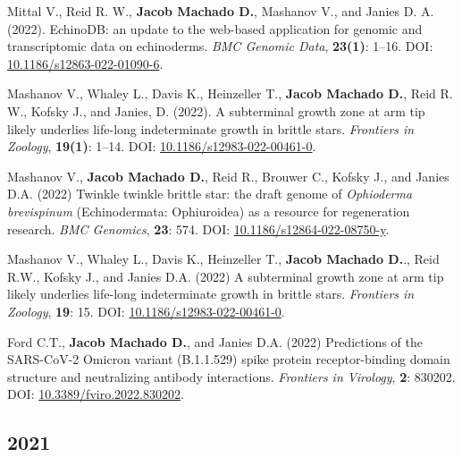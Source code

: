 \documentclass[11pt, letterpaper, sans]{moderncv}
\begin{document}
	{\setlength{\parskip}{.5em}\renewcommand{\baselinestretch}{2.0}\begin{hangparas}{.25in}{1}

		Mittal V., Reid R. W., \textbf{Jacob Machado D.}, Mashanov V., and Janies D. A. (2022). EchinoDB: an update to the web-based application for genomic and transcriptomic data on echinoderms. \textit{BMC Genomic Data}, \textbf{23(1)}: 1--16. DOI: \href{https://doi.org/10.1186/s12863-022-01090-6}{10.1186/s12863-022-01090-6}.

		Mashanov V., Whaley L., Davis K., Heinzeller T., \textbf{Jacob Machado D.}, Reid R. W., Kofsky J., and Janies, D. (2022). A subterminal growth zone at arm tip likely underlies life-long indeterminate growth in brittle stars. \textit{Frontiers in Zoology}, \textbf{19(1)}: 1--14. DOI: \href{https://doi.org/10.1186/s12983-022-00461-0}{10.1186/s12983-022-00461-0}.

		Mashanov V., \textbf{Jacob Machado D.}, Reid R., Brouwer C., Kofsky J., and Janies D.A. (2022) Twinkle twinkle brittle star: the draft genome of \textit{Ophioderma brevispinum} (Echinodermata: Ophiuroidea) as a resource for regeneration research. \textit{BMC Genomics}, \textbf{23}: 574. DOI: \href{https://doi.org/10.1186/s12864-022-08750-y}{10.1186/s12864-022-08750-y}.

		Mashanov V., Whaley L., Davis K., Heinzeller T., \textbf{Jacob Machado D.}., Reid R.W., Kofsky J., and Janies D.A. (2022) A subterminal growth zone at arm tip likely underlies life-long indeterminate growth in brittle stars. \textit{Frontiers in Zoology}, \textbf{19}: 15. DOI: \href{https://doi.org/10.1186/s12983-022-00461-0}{10.1186/s12983-022-00461-0}.

		Ford C.T., \textbf{Jacob Machado D.}, and Janies D.A. (2022) Predictions of the SARS-CoV-2 Omicron variant (B.1.1.529) spike protein receptor-binding domain structure and neutralizing antibody interactions. \textit{Frontiers in Virology}, \textbf{2}: 830202. DOI: \href{https://doi.org/10.3389/fviro.2022.830202}{10.3389/fviro.2022.830202}.

	\end{hangparas}}


\subsection{2021}
\end{document}
